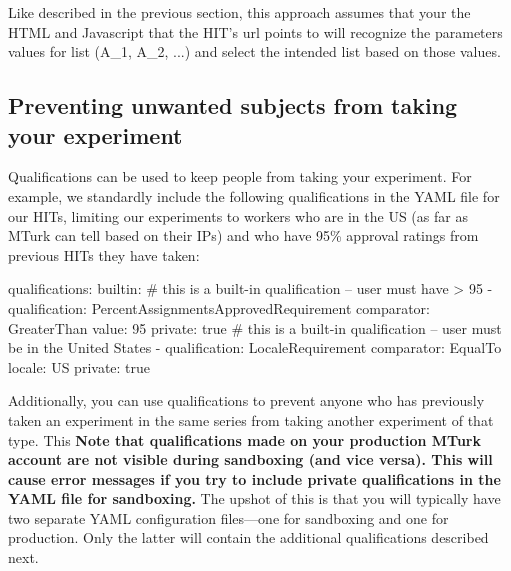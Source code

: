 \documentclass{article}
\newenvironment{code}%
   {\par\noindent\adjustbox{margin=1ex,bgcolor=shadecolor,margin=0ex \medskipamount}\bgroup\minipage\linewidth\verbatim}%
   {\endverbatim\endminipage\egroup}
\begin{document}
Like described in the previous section, this approach assumes that your the HTML and Javascript that the HIT's url points to will recognize the parameters values for list (A\_1, A\_2, ...) and select the intended list based on those values.


\subsection{Preventing unwanted subjects from taking your experiment}\label{sec:private-qualification}
Qualifications can be used to keep people from taking your experiment. For example, we standardly include the following qualifications in the YAML file for our HITs, limiting our experiments to workers who are in the US (as far as MTurk can tell based on their IPs) and who have 95\% approval ratings from previous HITs they have taken:

\begin{code}
qualifications:
  builtin:
   # this is a built-in qualification -- user must have > 95%
   - qualification: PercentAssignmentsApprovedRequirement
     comparator: GreaterThan
     value: 95
     private: true
   # this is a built-in qualification -- user must be in the United States
   - qualification: LocaleRequirement
     comparator: EqualTo
     locale: US
     private: true
\end{code}


Additionally, you can use qualifications to prevent anyone who has previously taken an experiment in the same series from taking another experiment of that type. This \textbf{Note that qualifications made on your production MTurk account are not visible during sandboxing (and vice versa). This will cause error messages if you try to include private qualifications in the YAML file for sandboxing.} The upshot of this is that you will typically have two separate YAML configuration files---one for sandboxing and one for production. Only the latter will contain the additional qualifications described next. 
\end{document}
